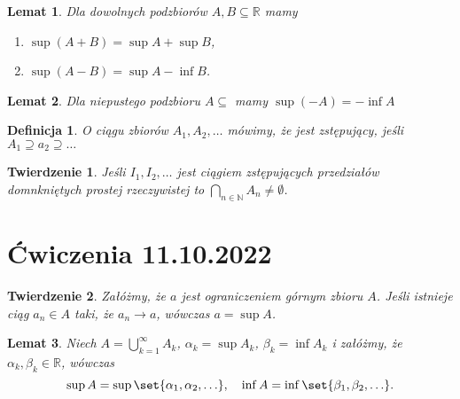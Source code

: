 \documentclass{article}
\newcommand{\R}{\mathbb{R}}
\newcommand{\N}{\mathbb{N}}
\DeclarePairedDelimiter\set\{\}
\newtheorem{lemma}{Lemat}
\newtheorem*{definition}{Definicja}
\newtheorem{theorem}{Twierdzenie}
\begin{document}
\begin{lemma} %
    Dla dowolnych podzbiorów $A,B \subseteq\R$ mamy
        \begin{enumerate}[label=(\alph*)]
            \item $\sup{(A+B)}=\sup{A}+\sup{B}$,
            \item $\sup{(A-B)}=\sup{A}-\inf{B}$.
        \end{enumerate}
\end{lemma}

\begin{lemma} %
    Dla niepustego podzbioru $A\subseteq$ mamy $\sup{(-A)}=-\inf{A}$
\end{lemma}

\begin{definition} %
O ciągu zbiorów $A_1, A_2,\ldots$ mówimy, że jest zstępujący, jeśli $A_1\supseteq a_2 \supseteq \ldots$
\end{definition}


\begin{theorem} %
    Jeśli $I_1, I_2, \ldots$ jest ciągiem zstępujących przedziałów domnkniętych prostej rzeczywistej
    to $\bigcap_{n\in\N}A_n\ne\emptyset$.
\end{theorem}

                                            \section{Ćwiczenia 11.10.2022}

\begin{theorem} %
    Załóżmy, że $a$ jest ograniczeniem górnym zbioru $A$. Jeśli istnieje ciąg $a_n\in A$
    taki, że $a_n\to a$, wówczas $a=\sup{A}$.
\end{theorem}

\begin{lemma} %
    Niech $A=\bigcup^{\infty}_{k=1}A_k$, $\alpha_k=\sup{A_k}$, $\beta_k=\inf{A_k}$ i 
    załóżmy, że $\alpha_k,\beta_k\in\R$, wówczas
        \begin{equation*}
            \sup{A}=\sup{\set{\alpha_1,\alpha_2,\ldots}},\quad\inf{A}=\inf{\set{\beta_1,\beta_2,\ldots}}.
        \end{equation*}
\end{lemma}
\end{document}

